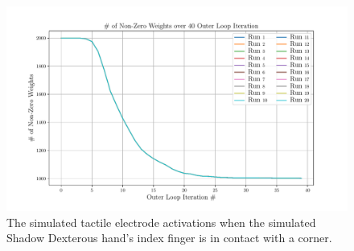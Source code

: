 \begin{figure}[!h]
	\begin{center}
		\includegraphics[width=\textwidth]{chapters/2-pose-estimation/fig/GNC-TLS-w-run-90-conv.pdf}
	\end{center}
	\caption{The simulated tactile electrode activations when the simulated Shadow Dexterous hand's index finger is in contact with a corner.}
	\label{app:GNC-TLS-w-run-90-conv}
\end{figure}